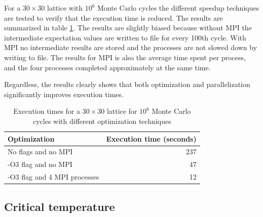 \documentclass{article}
\begin{document}
For a $30 \times 30$ lattice with $10^6$ Monte Carlo cycles the different speedup techniques are tested to verify that the execution time is reduced. The results are summarized in table \ref{tab:exec_times}. The results are slightly biased because without MPI the intermediate expectation values are written to file for every 100th cycle. With MPI no intermediate results are stored and the processes are not slowed down by writing to file. The results for MPI is also the average time spent per process, and the four processes completed approximately at the same time.

Regardless, the results clearly shows that both optimization and parallelization significantly improves execution times.

\begin{table}
\centering
\caption{Execution times for a $30\times 30$ lattice for $10^6$ Monte Carlo cycles with different optimization techniques}
\label{tab:exec_times}
\begin{tabularx}{\textwidth}{l r}
\hline
Optimization & Execution time (seconds) \\
\hline\hline
No flags and no MPI & 237 \\
-O3 flag and no MPI &  47 \\
-O3 flag and 4 MPI processes & 12 \\ 
\hline
\end{tabularx}
\end{table}


\FloatBarrier
\subsection{Critical temperature}
\end{document}

